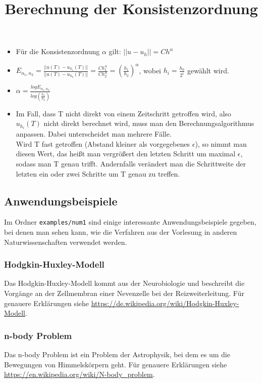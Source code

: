 \documentclass[a4paper,11pt]{article}
\theoremstyle{definition}
\begin{document}
\title{\textbf{Berechnung der Konsistenzordnung}}
\begin{itemize}
\item Für die Konsistenzordnung $\alpha$ gilt:
$ ||u-u_h||=Ch^\alpha$
\item $E_{n_1,n_2}= \frac{||u(T)-u_{h_1}(T)||}{||u(T)-u_{h_2}(T)||} = \frac{Ch_1^\alpha}{Ch_2^\alpha}= \left(\frac{h_1}{h_2}\right)^\alpha$, wobei $h_i=\frac{h_0}{2^i}$ gewählt wird.
\item $\alpha= \frac{log E_{n_1,n_2}}{log \left( \frac{h_1}{h_2} \right)}$
\item Im Fall, dass T nicht direkt von einem Zeitschritt getroffen wird, also $u_{h_i}(T)$ nicht direkt berechnet wird, muss man den Berechnungsalgorithmus anpassen. Dabei unterscheidet man mehrere Fälle. \\
Wird T fast getroffen (Abstand kleiner als vorgegebenes $\epsilon$), so nimmt man diesen Wert, das heißt man vergrößert den letzten Schritt um maximal $\epsilon$, sodass man T genau trifft. Andernfalls verändert man die Schrittweite der letzten ein oder zwei Schritte um T genau zu treffen.
\end{itemize}



\subsection{Anwendungsbeispiele}
Im Ordner \lstinline{examples/num1} sind einige interessante Anwendungsbeispiele gegeben, bei denen man sehen kann, wie die Verfahren aus der Vorlesung in anderen Naturwissenschaften verwendet werden.

\subsubsection{Hodgkin-Huxley-Modell}
Das Hodgkin-Huxley-Modell kommt aus der Neurobiologie und beschreibt die Vorgänge an der Zellmembran einer Nevenzelle bei der Reizweiterleitung. Für genauere Erklärungen siehe \url{https://de.wikipedia.org/wiki/Hodgkin-Huxley-Modell}.

\subsubsection{n-body Problem}
Das n-body Problem ist ein Problem der Astrophysik, bei dem es um die Bewegungen von Himmelskörpern geht. Für genauere Erklärungen siehe \url{https://en.wikipedia.org/wiki/N-body_problem}.
\end{document}
